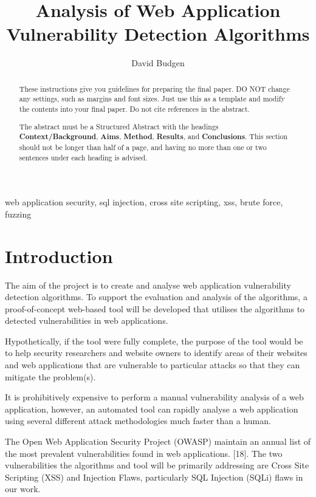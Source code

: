 \documentclass[12pt,a4paper]{article}
\title{Analysis of Web Application Vulnerability Detection Algorithms}
\author{David Budgen}
\date{}
\begin{document}
\maketitle

\begin{abstract}
These instructions give you guidelines for preparing the final paper.  DO NOT change any settings, such as margins and font sizes.  Just use this as a template and modify the contents into your final paper.  Do not cite references in the abstract.

The abstract must be a Structured Abstract with the headings {\bf Context/Background}, {\bf Aims}, {\bf Method}, {\bf Results}, and {\bf Conclusions}.  This section should not be longer than half of a page, and having no more than one or two sentences under each heading is advised.
\end{abstract}

\begin{keywords}
web application security, sql injection, cross site scripting, xss, brute force, fuzzing
\end{keywords}

\section{Introduction}
The aim of the project is to create and analyse web application vulnerability detection algorithms.  To support the evaluation and analysis of the algorithms, a proof-of-concept web-based tool will be developed that utilises the algorithms to detected vulnerabilities in web applications.

Hypothetically, if the tool were fully complete, the purpose of the tool would be to help security researchers and website owners to identify areas of their websites and web applications that are vulnerable to particular attacks so that they can mitigate the problem(s).

It is prohibitively expensive to perform a manual vulnerability analysis of a web application, however, an automated tool can rapidly analyse a web application using several different attack methodologies much faster than a human.

The Open Web Application Security Project (OWASP) maintain an annual list of the most prevalent vulnerabilities found in web applications. [18].  The two vulnerabilities the algorithms and tool will be primarily addressing are Cross Site Scripting (XSS) and Injection Flaws, particularly SQL Injection (SQLi) flaws in our work.
\end{document}
